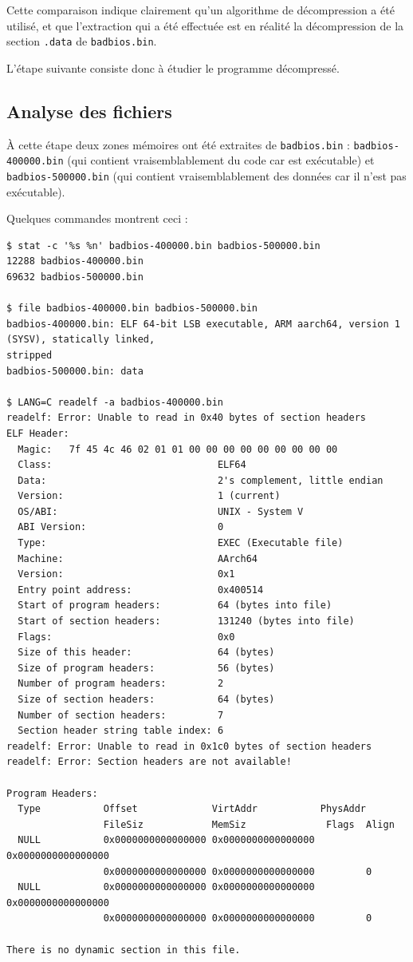 \documentclass[a4paper,10pt]{article}
\begin{document}
Cette comparaison indique clairement qu'un algorithme de décompression a été utilisé, et que l'extraction qui a été effectuée est en réalité la décompression de la section \texttt{.data} de \texttt{badbios.bin}.

L'étape suivante consiste donc à étudier le programme décompressé.

\subsection{Analyse des fichiers}
\label{arm64fileanalysis}

À cette étape deux zones mémoires ont été extraites de \texttt{badbios.bin} : \texttt{badbios-400000.bin} (qui contient vraisemblablement du code car est exécutable) et \texttt{badbios-500000.bin} (qui contient vraisemblablement des données car il n'est pas exécutable).

Quelques commandes montrent ceci :
\begin{verbatim}
$ stat -c '%s %n' badbios-400000.bin badbios-500000.bin
12288 badbios-400000.bin
69632 badbios-500000.bin

$ file badbios-400000.bin badbios-500000.bin
badbios-400000.bin: ELF 64-bit LSB executable, ARM aarch64, version 1 (SYSV), statically linked,
stripped
badbios-500000.bin: data

$ LANG=C readelf -a badbios-400000.bin
readelf: Error: Unable to read in 0x40 bytes of section headers
ELF Header:
  Magic:   7f 45 4c 46 02 01 01 00 00 00 00 00 00 00 00 00
  Class:                             ELF64
  Data:                              2's complement, little endian
  Version:                           1 (current)
  OS/ABI:                            UNIX - System V
  ABI Version:                       0
  Type:                              EXEC (Executable file)
  Machine:                           AArch64
  Version:                           0x1
  Entry point address:               0x400514
  Start of program headers:          64 (bytes into file)
  Start of section headers:          131240 (bytes into file)
  Flags:                             0x0
  Size of this header:               64 (bytes)
  Size of program headers:           56 (bytes)
  Number of program headers:         2
  Size of section headers:           64 (bytes)
  Number of section headers:         7
  Section header string table index: 6
readelf: Error: Unable to read in 0x1c0 bytes of section headers
readelf: Error: Section headers are not available!

Program Headers:
  Type           Offset             VirtAddr           PhysAddr
                 FileSiz            MemSiz              Flags  Align
  NULL           0x0000000000000000 0x0000000000000000 0x0000000000000000
                 0x0000000000000000 0x0000000000000000         0
  NULL           0x0000000000000000 0x0000000000000000 0x0000000000000000
                 0x0000000000000000 0x0000000000000000         0

There is no dynamic section in this file.
\end{verbatim}
\end{document}
